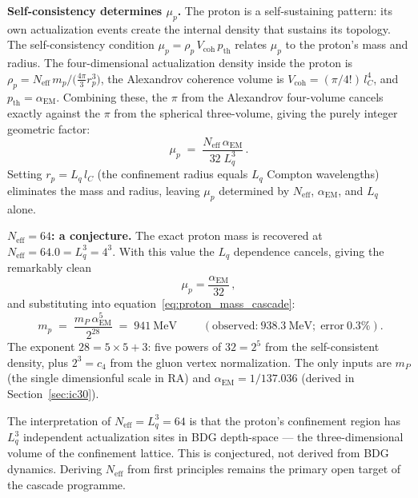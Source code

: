 \documentclass[11pt,a4paper]{article}
\begin{document}
\textbf{Self-consistency determines $\mu_p$.}
The proton is a self-sustaining pattern: its own actualization events create the
internal density that sustains its topology. The self-consistency condition
$\mu_p = \rho_p\,V_{\mathrm{coh}}\,p_{\mathrm{th}}$ relates $\mu_p$ to the
proton's mass and radius. The four-dimensional actualization density inside
the proton is $\rho_p = N_{\mathrm{eff}}\,m_p/\bigl(\tfrac{4\pi}{3}r_p^3\bigr)$,
the Alexandrov coherence volume is $V_{\mathrm{coh}} = (\pi/4!)\,l_C^4$, and
$p_{\mathrm{th}} = \alpha_{\mathrm{EM}}$. Combining these, the $\pi$ from the
Alexandrov four-volume cancels exactly against the $\pi$ from the spherical
three-volume, giving the purely integer geometric factor:
\begin{equation}
  \mu_p
  \;=\; \frac{N_{\mathrm{eff}}\,\alpha_{\mathrm{EM}}}{32\;L_q^3}\,.
  \label{eq:mu_p_self_consistent}
\end{equation}
Setting $r_p = L_q\,l_C$ (the confinement radius equals $L_q$ Compton wavelengths)
eliminates the mass and radius, leaving $\mu_p$ determined by $N_{\mathrm{eff}}$,
$\alpha_{\mathrm{EM}}$, and $L_q$ alone.

\textbf{$N_{\mathrm{eff}} = 64$: a conjecture.}
The exact proton mass is recovered at $N_{\mathrm{eff}} = 64.0 = L_q^3 = 4^3$.
With this value the $L_q$ dependence cancels, giving the remarkably clean
\begin{equation}
  \mu_p = \frac{\alpha_{\mathrm{EM}}}{32}\,,
  \label{eq:mu_alpha32}
\end{equation}
and substituting into equation~\eqref{eq:proton_mass_cascade}:
\begin{equation}
  \boxed{\;m_p
  \;=\; \frac{m_P\,\alpha_{\mathrm{EM}}^5}{2^{28}}
  \;=\; 941~\mathrm{MeV}\;}
  \qquad (\text{observed:}~938.3~\mathrm{MeV};\;\text{error}~0.3\%).
  \label{eq:proton_mass_numerical}
\end{equation}
The exponent $28 = 5 \times 5 + 3$: five powers of $32 = 2^5$ from the
self-consistent density, plus $2^3 = c_4$ from the gluon vertex normalization.
The only inputs are $m_P$ (the single dimensionful scale in RA) and
$\alpha_{\mathrm{EM}} = 1/137.036$ (derived in Section~\ref{sec:ic30}).

The interpretation of $N_{\mathrm{eff}} = L_q^3 = 64$ is that the proton's
confinement region has $L_q^3$ independent actualization sites in
BDG depth-space --- the three-dimensional volume of the confinement lattice.
This is conjectured, not derived from BDG dynamics.
Deriving $N_{\mathrm{eff}}$ from first principles remains the primary open
target of the cascade programme.
\end{document}
